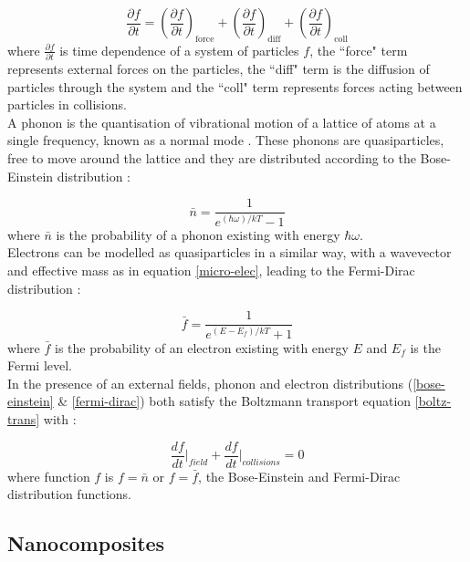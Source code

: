 \documentclass[a4paper,10pt,journal]{IEEEtran}
\begin{document}
\begin{equation}
\label{boltz-trans}
	\frac{\partial f}{\partial t} = \left(\frac{\partial f}{\partial
	t}\right)_\mathrm{force} + \left(\frac{\partial f}{\partial t}\right)_\mathrm{diff}+ \left(\frac{\partial f}{\partial t}\right)_\mathrm{coll}
\end{equation}
where $\frac{\partial f}{\partial t}$ is time dependence of a system
of particles $f$, the ``force" term represents external forces on the
particles, the ``diff" term is the diffusion of particles through the
system and the ``coll" term represents forces acting between particles
in collisions.\\
A phonon is the quantisation of vibrational motion of a lattice of
atoms at a single frequency, known as a normal mode \cite{kittel}. These phonons are
quasiparticles, free to move around the lattice and they are
distributed according to the Bose-Einstein distribution \cite{kittel}:

\begin{equation}
\label{bose-einstein}
	 \bar{n} = \frac{1}{e^{(\hbar \omega) / k T} - 1}
\end{equation}
where $\bar{n}$ is the probability of a phonon existing with energy
$\hbar \omega$.\\
Electrons can be modelled as quasiparticles in a similar way, with a
wavevector and effective mass as in equation \eqref{micro-elec},
leading to the Fermi-Dirac distribution \cite{kittel}:

\begin{equation}
\label{fermi-dirac}
	 \bar{f} = \frac{1}{e^{(E - E_f) / k T} + 1}
\end{equation}
where $\bar{f}$ is the probability of an electron existing with energy
$E$ and $E_f$ is the Fermi level.\\
In the presence of an external fields, phonon and electron
distributions (\eqref{bose-einstein} \& \eqref{fermi-dirac}) both
satisfy the Boltzmann transport equation \eqref{boltz-trans} with
\cite{ziman}:

\begin{equation}
\label{boltz-specific}
	\frac{df}{dt}\bigg|_{field} + \frac{df}{dt}\bigg|_{collisions} = 0
\end{equation}
where function $f$ is $f = \bar{n}$ or $f = \bar{f}$, the Bose-Einstein
and Fermi-Dirac distribution functions.

\subsection{Nanocomposites}
\end{document}
